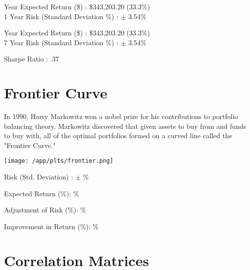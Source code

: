 \documentclass{article}
\begin{document}
 Year Expected Return (\$) : \$343,203.20 (33.3\%)\\
1 Year Risk (Standard Deviation \%) : $\pm$ 3.54\%

 Year Expected Return (\$) : \$343,203.20 (33.3\%)\\
7 Year Risk (Standard Deviation \%) : $\pm$ 3.54\%

\noindent
Sharpe Ratio : .37


\newpage



\section{Frontier Curve}

In 1990, Harry Markowitz won a nobel prize for his contributions to portfolio balancing theory. Markowitz discovered that given assets to buy from and funds to buy with, all of the optimal portfolios formed on a curved line called the "Frontier Curve."

\vspace{2cm}

\hspace*{-1cm}\texttt{[image: /app/plts/frontier.png]}\par

\vspace{1cm}


Risk (Std. Deviation) : $\pm$ {} \%

Expected Return (\%): {} \%

Adjustment of Risk (\%): {} \%

Improvement in Return (\%): {} \%


\newpage

\section{Correlation Matrices}

\vspace{1cm}
\end{document}
